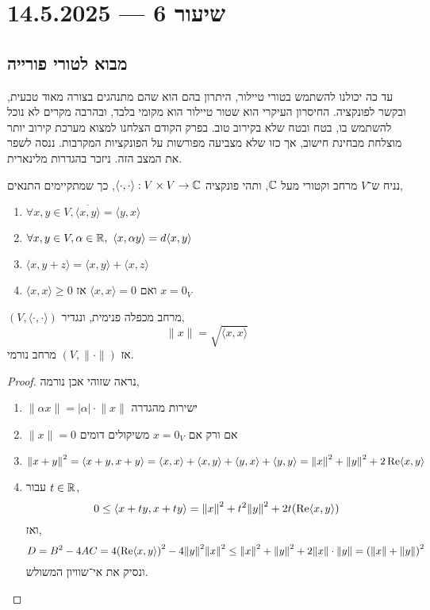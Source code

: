 \section{שיעור 6 --- 14.5.2025}
\subsection{מבוא לטורי פורייה}
עד כה יכולנו להשתמש בטורי טיילור, היתרון בהם הוא שהם מתנהגים בצורה מאוד טבעית, ובקשר לפונקציה.
החיסרון העיקרי הוא שטור טיילור הוא מקומי בלבד, ובהרבה מקרים לא נוכל להשתמש בו, בטח ובטח שלא בקירוב טוב.
בפרק הקודם הצלחנו למצוא מערכת קירוב יותר מוצלחת מבחינת חישוב, אך כזו שלא מצביעה מפורשות על הפונקציות המקרבות.
ננסה לשפר את המצב הזה.
ניזכר בהגדרות מלינארית.
\begin{definition}
	נניח ש־$V$ מרחב וקטורי מעל $\mathbb{C}$, ותהי פונקציה $\langle \cdot, \cdot \rangle : V \times V \to \mathbb{C}$,
	כך שמתקיימים התנאים,
	\begin{enumerate}
		\item $\forall x, y \in V, \overline{\langle x, y \rangle} = \langle y, x \rangle$
		\item $\forall x, y \in V, \alpha \in \RR,\ \langle x, \alpha y \rangle = d \langle x, y \rangle$
		\item $\langle x, y + z \rangle = \langle x, y \rangle + \langle x, z \rangle$
		\item $\langle x, x \rangle \ge 0$ ואם $\langle x, x \rangle = 0$ אז $x = 0_V$
	\end{enumerate}
\end{definition}
\begin{theorem}
	$(V, \langle \cdot, \cdot \rangle)$ מרחב מכפלה פנימית,
	ונגדיר,
	\[
		\lVert x \rVert
		= \sqrt{\langle x, x \rangle}
	\]
	אז $(V, \lVert \cdot \rVert)$ מרחב נורמי.
\end{theorem}
\begin{proof}
	נראה שזוהי אכן נורמה,
	\begin{enumerate}
		\item $\lVert \alpha x \rVert = |\alpha| \cdot \lVert x \rVert$ ישירות מהגדרה
		\item $\lVert x \rVert = 0$ אם ורק אם $x = 0_V$ משיקולים דומים
		\item \[
				{\lVert x + y \rVert}^2 
				= \langle x + y, x + y \rangle 
				= \langle x, x \rangle + \langle x, y \rangle + \langle y, x \rangle + \langle y, y \rangle 
				= {\lVert x \rVert}^2 + {\lVert y \rVert}^2 + 2 \operatorname{Re} \langle x, y \rangle
			\]
		\item עבור $t \in \mathbb{R}$,
			\[
				0 \le \langle x + ty, x + ty \rangle
				= {\lVert x \rVert}^2 + t^2 {\lVert y \rVert}^2 + 2t (\operatorname{Re} \langle x, y \rangle)
			\]
			ואז,
			\[
				D 
				= B^2 - 4AC 
				= 4 {(\operatorname{Re} \langle x, y \rangle)}^2 - 4 {\lVert y \rVert}^2 {\lVert x \rVert}^2 \le {\lVert x \rVert}^2 + {\lVert y \rVert}^2 + 2 \lVert x \rVert \cdot \lVert y \rVert 
				= {(\lVert x \rVert + \lVert y \rVert)}^2
			\]
			ונסיק את אי־שוויון המשולש.
	\end{enumerate}
\end{proof}
